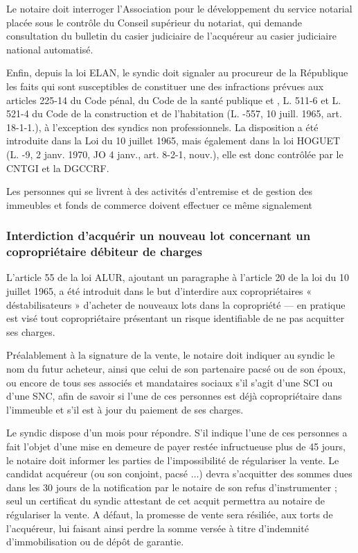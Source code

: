 			Le notaire doit interroger l'Association pour le développement du service notarial placée sous le contrôle
			du Conseil supérieur du notariat, qui demande consultation du bulletin  du casier judiciaire de
			l'acquéreur au casier judiciaire national automatisé.
			
			Enfin, depuis la loi ELAN, le syndic doit signaler au procureur de la République les faits qui sont susceptibles
			de constituer une des infractions prévues aux articles 225-14 du Code pénal,  du Code de la santé
			publique et , L. 511-6 et L. 521-4 du Code de la construction et de l'habitation (L. -557, 10 juill.
			1965, art. 18-1-1.), à l’exception des syndics non professionnels. La disposition a été introduite dans la Loi
			du 10 juillet 1965, mais également dans la loi HOGUET (L. -9, 2 janv. 1970, JO 4 janv., art. 8-2-1, nouv.),
			elle est donc contrôlée par le CNTGI et la DGCCRF.
			
			Les personnes qui se livrent à des activités d'entremise et de gestion des immeubles et fonds de commerce
			doivent effectuer ce même signalement
		
		\subsubsection{Interdiction d’acquérir un nouveau lot concernant un copropriétaire débiteur de charges}
		
			L’article 55 de la loi ALUR, ajoutant un paragraphe \II{} à l’article 20 de la loi du 10 juillet 1965, a été introduit
			dans le but d’interdire aux copropriétaires « déstabilisateurs » d’acheter de nouveaux lots dans la
			copropriété –-- en pratique est visé tout copropriétaire présentant un risque identifiable de ne pas acquitter
			ses charges.
			
			Préalablement à la signature de la vente, le notaire doit indiquer au syndic le nom du futur acheteur, ainsi
			que celui de son partenaire pacsé ou de son époux, ou encore de tous ses associés et mandataires sociaux
			s’il s’agit d’une SCI ou d’une SNC, afin de savoir si l’une de ces personnes est déjà copropriétaire dans
			l’immeuble et s’il est à jour du paiement de ses charges.
			
			Le syndic dispose d’un mois pour répondre. S’il indique l’une de ces personnes a fait l’objet d’une mise en
			demeure de payer restée infructueuse plus de 45 jours, le notaire doit informer les parties de
			l’impossibilité de régulariser la vente. Le candidat acquéreur (ou son conjoint, pacsé $\dots$) devra s’acquitter
			des sommes dues dans les 30 jours de la notification par le notaire de son refus d’instrumenter ; seul un
			certificat du syndic attestant de cet acquit permettra au notaire de régulariser la vente. A défaut, la
			promesse de vente sera résiliée, aux torts de l’acquéreur, lui faisant ainsi perdre la somme versée à titre
			d’indemnité d’immobilisation ou de dépôt de garantie.
			
